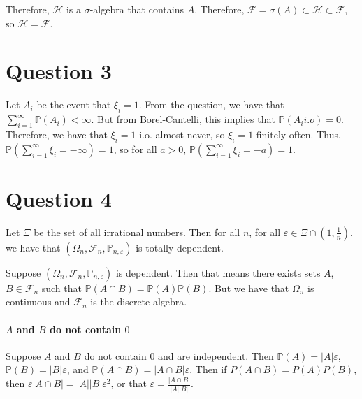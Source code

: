 \documentclass{article}
\theoremstyle{definition}
\numberwithin{theorem}{section}
\numberwithin{equation}{section}
\begin{document}
Therefore, $\mathcal{H}$ is a $\sigma$-algebra that contains $A$. Therefore, $\mathcal{F} = \sigma(A) \subset \mathcal{H} \subset \mathcal{F}$, so $\mathcal{H} = \mathcal{F}$.  
\section{Question 3}
Let $A_i$ be the event that $\xi_i= 1$. From the question, we have that $\sum_{i = 1}^{\infty}\mathbb{P}(A_i) < \infty$. But from Borel-Cantelli, this implies that $\mathbb{P}(A_i i.o) = 0$. Therefore, we have that $\xi_i = 1$ i.o. almost never, so $\xi_i = 1$ finitely often. Thus, $\mathbb{P}\left(\sum_{i = 1}^{\infty} \xi_i = - \infty \right) = 1$, so for all $a > 0$, $\mathbb{P}\left(\sum_{i = 1}^{\infty} \xi_i = - a \right) = 1$. 

\section{Question 4}
Let $\Xi$ be the set of all irrational numbers. Then for all $n$, for all $\varepsilon \in \Xi \cap (1, \frac{1}{n})$, we have that $(\Omega_n, \mathcal{F}_n, \mathbb{P}_{n, \varepsilon})$ is totally dependent. 

\par
Suppose $(\Omega_n, \mathcal{F}_n, \mathbb{P}_{n, \varepsilon})$ is dependent. Then that means there exists sets $A$, $B \in \mathcal{F}_n$ such that $\mathbb{P}(A \cap B) = \mathbb{P}(A) \mathbb{P}(B)$. But we have that $\Omega_n$ is continuous and $\mathcal{F}_n$ is the discrete algebra.

\paragraph{$A$ and $B$ do not contain $0$}
Suppose $A$ and $B$ do not contain $0$ and are independent. Then $\mathbb{P}(A) = |A| \varepsilon$, $\mathbb{P}(B) = |B| \varepsilon$, and $\mathbb{P}(A \cap B) = |A \cap B| \varepsilon$. Then if $P(A \cap B) = P(A) P(B)$, then $\varepsilon |A \cap B| = |A| |B| \varepsilon^2$, or that $\varepsilon = \frac{|A \cap B|}{|A| |B|}$. 
\end{document}
